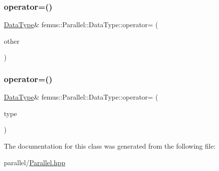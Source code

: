 \mbox{\label{classfemus_1_1_parallel_1_1_data_type_abe3ac0e3773f8cf27a51709334f2734e}} 
\subsubsection{\texorpdfstring{operator=()}{operator=()}\hspace{0.1cm}{\footnotesize\ttfamily [1/2]}}
{\footnotesize\ttfamily \mbox{\hyperlink{classfemus_1_1_parallel_1_1_data_type}{Data\+Type}}\& femus\+::\+Parallel\+::\+Data\+Type\+::operator= (\begin{DoxyParamCaption}\item[{const \mbox{\hyperlink{classfemus_1_1_parallel_1_1_data_type}{Data\+Type}} \&}]{other }\end{DoxyParamCaption})\hspace{0.3cm}{\ttfamily [inline]}}

\mbox{\label{classfemus_1_1_parallel_1_1_data_type_ae740008e90c5043d963e272f8851cbfb}} 
\subsubsection{\texorpdfstring{operator=()}{operator=()}\hspace{0.1cm}{\footnotesize\ttfamily [2/2]}}
{\footnotesize\ttfamily \mbox{\hyperlink{classfemus_1_1_parallel_1_1_data_type}{Data\+Type}}\& femus\+::\+Parallel\+::\+Data\+Type\+::operator= (\begin{DoxyParamCaption}\item[{const \mbox{\hyperlink{structfemus_1_1_parallel_1_1data__type}{data\+\_\+type}} \&}]{type }\end{DoxyParamCaption})\hspace{0.3cm}{\ttfamily [inline]}}



The documentation for this class was generated from the following file\+:\begin{DoxyCompactItemize}
\item 
parallel/\mbox{\hyperlink{_parallel_8hpp}{Parallel.\+hpp}}\end{DoxyCompactItemize}
